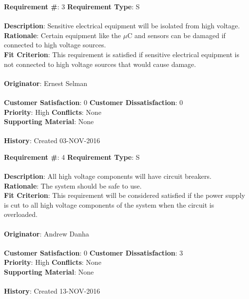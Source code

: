 \documentclass[titlepage]{article}
\begin{document}
\begin{framed}
	\noindent\textbf{Requirement \#}: 3 \hfill \textbf{Requirement Type}: S \hfill\\\\
	\noindent\textbf{Description}: Sensitive electrical equipment will be isolated from high voltage.\\
	\textbf{Rationale}: Certain equipment like the $\mu$C and sensors can be damaged if connected to high voltage sources.\\
	\textbf{Fit Criterion}: This requirement is satisfied if sensitive electrical equipment is not connected to high voltage sources that would cause damage.\\\\
	\textbf{Originator}: Ernest Selman\\\\
	\noindent\textbf{Customer Satisfaction}: 0 \hfill 	\textbf{Customer Dissatisfaction}: 0 \hfill\\
	\textbf{Priority}: High \hfill \textbf{Conflicts}: None \hfill\\
	\textbf{Supporting Material}: None\\\\
	\noindent\textbf{History}: Created 03-NOV-2016
\end{framed}

\begin{framed}
	\noindent\textbf{Requirement \#}: 4 \hfill \textbf{Requirement Type}: S \hfill\\\\
	\noindent\textbf{Description}: All high voltage components will have circuit breakers.\\
	\textbf{Rationale}: The system should be safe to use.\\
	\textbf{Fit Criterion}: This requirement will be considered satisfied if the power supply is cut to all high voltage components of the system when the circuit is overloaded.\\\\
	\textbf{Originator}: Andrew Danha\\\\
	\noindent\textbf{Customer Satisfaction}: 0 \hfill 	\textbf{Customer Dissatisfaction}: 3 \hfill\\
	\textbf{Priority}: High \hfill \textbf{Conflicts}: None \hfill\\
	\textbf{Supporting Material}: None\\\\
	\noindent\textbf{History}: Created 13-NOV-2016
\end{framed}
\end{document}
